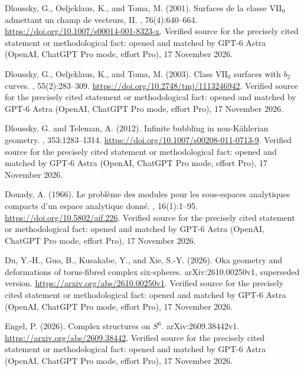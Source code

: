 \begin{thebibliography}{}
Dloussky, G., Oeljeklaus, K., and Toma, M. (2001).
\newblock Surfaces de la classe {VII}$_0$ admettant un champ de vecteurs, {II}.
, 76(4):640--664.
\newblock \url{https://doi.org/10.1007/s00014-001-8323-x}. Verified source for the precisely cited statement or methodological fact: opened and matched by GPT-6 Astra (OpenAI, ChatGPT Pro mode, effort Pro), 17 November 2026.

Dloussky, G., Oeljeklaus, K., and Toma, M. (2003).
\newblock Class {$\mathrm{VII}_0$} surfaces with {$b_2$} curves.
, 55(2):283--309.
\newblock \url{https://doi.org/10.2748/tmj/1113246942}. Verified source for the precisely cited statement or methodological fact: opened and matched by GPT-6 Astra (OpenAI, ChatGPT Pro mode, effort Pro), 17 November 2026.

Dloussky, G. and Teleman, A. (2012).
\newblock Infinite bubbling in non-{K\"ahlerian} geometry.
, 353:1283--1314.
\newblock \url{https://doi.org/10.1007/s00208-011-0713-9}. Verified source for the precisely cited statement or methodological fact: opened and matched by GPT-6 Astra (OpenAI, ChatGPT Pro mode, effort Pro), 17 November 2026.

Douady, A. (1966).
\newblock Le probl\`eme des modules pour les sous-espaces analytiques compacts
  d'un espace analytique donn\'e.
, 16(1):1--95.
\newblock \url{https://doi.org/10.5802/aif.226}. Verified source for the precisely cited statement or methodological fact: opened and matched by GPT-6 Astra (OpenAI, ChatGPT Pro mode, effort Pro), 17 November 2026.

Du, Y.-H., Guo, B., Kusakabe, Y., and Xie, S.-Y. (2026).
\newblock Oka geometry and deformations of torus-fibred complex six-spheres.
\newblock arXiv:2610.00250v1, superseded version.
\newblock \url{https://arxiv.org/abs/2610.00250v1}. Verified source for the precisely cited statement or methodological fact: opened and matched by GPT-6 Astra (OpenAI, ChatGPT Pro mode, effort Pro), 17 November 2026.

Engel, P. (2026).
\newblock Complex structures on {$S^6$}.
\newblock arXiv:2609.38442v1.
\newblock \url{https://arxiv.org/abs/2609.38442}. Verified source for the precisely cited statement or methodological fact: opened and matched by GPT-6 Astra (OpenAI, ChatGPT Pro mode, effort Pro), 17 November 2026.


\end{thebibliography}
